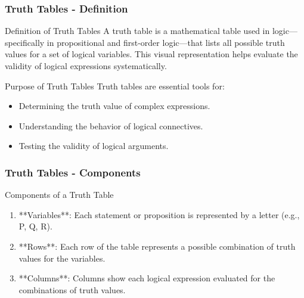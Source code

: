 \documentclass[aspectratio=169]{beamer}
\begin{document}
\begin{frame}[fragile]
    \frametitle{Truth Tables - Definition}
    \begin{block}{Definition of Truth Tables}
        A truth table is a mathematical table used in logic—specifically in propositional and first-order logic—that lists all possible truth values for a set of logical variables. This visual representation helps evaluate the validity of logical expressions systematically.
    \end{block}
    
    \begin{block}{Purpose of Truth Tables}
        Truth tables are essential tools for:
        \begin{itemize}
            \item Determining the truth value of complex expressions.
            \item Understanding the behavior of logical connectives.
            \item Testing the validity of logical arguments.
        \end{itemize}
    \end{block}
\end{frame}

\begin{frame}[fragile]
    \frametitle{Truth Tables - Components}
    \begin{block}{Components of a Truth Table}
        \begin{enumerate}
            \item **Variables**: Each statement or proposition is represented by a letter (e.g., P, Q, R).
            \item **Rows**: Each row of the table represents a possible combination of truth values for the variables.
            \item **Columns**: Columns show each logical expression evaluated for the combinations of truth values.
        \end{enumerate}
    \end{block}
\end{frame}
\end{document}
